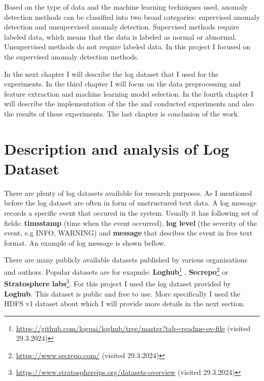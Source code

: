 Based on the type of data and the machine learning techniques used, anomaly detection methods can be classified into two broad categories: supervised anomaly detection and unsupervised
anomaly detection. Supervised methods require labeled data, which means that the data is labeled as normal or abnormal. Unsupervised methods do not require labeled data. In this project I focused on 
the supervised anomaly detection methods.

In the next chapter I will describe the log dataset that I used for the experiments. In the third chapter I will focus on the data preprocessing and feature extraction and machine learning model selection.
In the fourth chapter I will describe the implementation of the the and conducted experiments and also the results of these experiments. The last chapter is conclusion of the work.

\chapter{Description and analysis of Log Dataset}

There are plenty of log datasets available for research purposes. As I mentioned before the log dataset are often in form of unstructured text data.
A log message records a specific event that occured in the system. Usually it has following set of fields: \textbf{timsstamp} (time when the event occurred), \textbf{log level} (the severity
of the event, e.g INFO, WARNING) and \textbf{message} that descibes the event in free text format. An example of log message is shown bellow.

\begin{center}


\end{center}

There are many publicly available datasets published by various organizations and authors. Popular datasets are for exapmle: \textbf{Loghub}\footnote{\url{https://github.com/logpai/loghub/tree/master?tab=readme-ov-file} (visited 29.3.2024)} , %
\textbf{Secrepo}\footnote{\url{https://www.secrepo.com/} (visited 29.3.2024)} or \textbf{Stratosphere labs}\footnote{\url{https://www.stratosphereips.org/datasets-overview} (visited 29.3.2024)}. For this project I used the log dataset provided by \textbf{Loghub}. This dataset is public and free to use. 
More specifically I used the HDFS v1 dataset about which I will provide more details in the next section.

